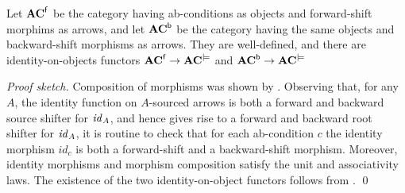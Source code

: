 \begin{theorem} 
Let $\mathbf{AC}^{{\mathsf{f}}}$ be the category having ab-conditions as objects and forward-shift morphims as arrows, and let $\mathbf{AC}^{{\mathsf{b}}}$ be the category having the same objects and backward-shift morphisms as arrows. They are well-defined, and there are identity-on-objects functors $\mathbf{AC}^{{\mathsf{f}}} \to \mathbf{AC}^{\models}$ and $\mathbf{AC}^{{\mathsf{b}}} \to \mathbf{AC}^{\models}$
\end{theorem}
%
\emph{Proof sketch.} Composition of morphisms was shown by .
Observing that, for any $A$, the identity function on $A$-sourced arrows is both a forward and backward source shifter for $\mathit{id}_A$, and hence gives rise to a forward and backward root shifter for $\mathit{id}_A$, it is routine to check that for each ab-condition $c$ the identity morphism $id_c$ is both a forward-shift and a backward-shift morphism. Moreover, identity morphisms and morphism composition satisfy the unit and associativity laws. The existence of the two identity-on-object functors follows from .
\qed 

